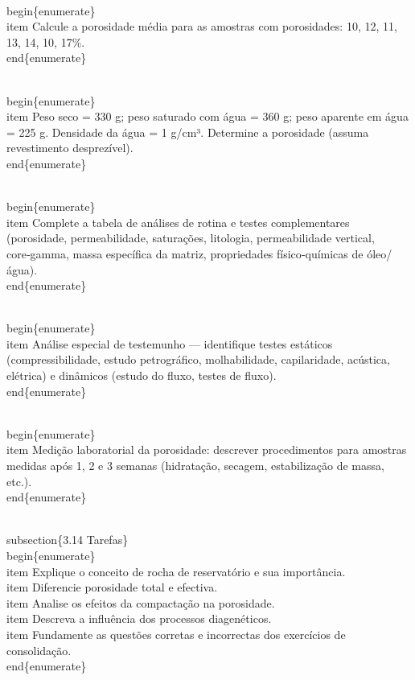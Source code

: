 \documentclass[11pt,a4paper]{article}
\begin{document}
\begin{enumerate}
{\\begin\{enumerate\}
\\item Calcule a porosidade média para as amostras com porosidades: 10, 12, 11, 13, 14, 10, 17\%.
\\end\{enumerate\}

\\begin\{enumerate\}
\\item Peso seco = 330 g; peso saturado com água = 360 g; peso aparente em água = 225 g. Densidade da água = 1 g/cm³. Determine a porosidade (assuma revestimento desprezível).
\\end\{enumerate\}

\\begin\{enumerate\}
\\item Complete a tabela de análises de rotina e testes complementares (porosidade, permeabilidade, saturações, litologia, permeabilidade vertical, core‑gamma, massa específica da matriz, propriedades físico‑químicas de óleo/água).
\\end\{enumerate\}

\\begin\{enumerate\}
\\item Análise especial de testemunho — identifique testes estáticos (compressibilidade, estudo petrográfico, molhabilidade, capilaridade, acústica, elétrica) e dinâmicos (estudo do fluxo, testes de fluxo).
\\end\{enumerate\}

\\begin\{enumerate\}
\\item Medição laboratorial da porosidade: descrever procedimentos para amostras medidas após 1, 2 e 3 semanas (hidratação, secagem, estabilização de massa, etc.).
\\end\{enumerate\}

\\subsection\{3.14 Tarefas\}
\\begin\{enumerate\}
\\item Explique o conceito de rocha de reservatório e sua importância.
\\item Diferencie porosidade total e efectiva.
\\item Analise os efeitos da compactação na porosidade.
\\item Descreva a influência dos processos diagenéticos.
\\item Fundamente as questões corretas e incorrectas dos exercícios de consolidação.
\\end\{enumerate\}

}
\end{enumerate}
\end{document}
